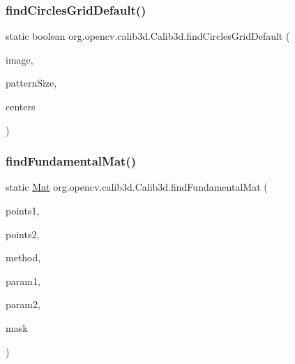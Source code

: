 \subsubsection{\texorpdfstring{find\+Circles\+Grid\+Default()}{findCirclesGridDefault()}\hspace{0.1cm}{\footnotesize\ttfamily [2/2]}}
{\footnotesize\ttfamily static boolean org.\+opencv.\+calib3d.\+Calib3d.\+find\+Circles\+Grid\+Default (\begin{DoxyParamCaption}\item[{\mbox{\hyperlink{classorg_1_1opencv_1_1core_1_1_mat}{Mat}}}]{image,  }\item[{\mbox{\hyperlink{classorg_1_1opencv_1_1core_1_1_size}{Size}}}]{pattern\+Size,  }\item[{\mbox{\hyperlink{classorg_1_1opencv_1_1core_1_1_mat}{Mat}}}]{centers }\end{DoxyParamCaption})\hspace{0.3cm}{\ttfamily [static]}}

\mbox{\label{classorg_1_1opencv_1_1calib3d_1_1_calib3d_a3dedba28209d17c56b4470b9cce95596}} 
\subsubsection{\texorpdfstring{find\+Fundamental\+Mat()}{findFundamentalMat()}\hspace{0.1cm}{\footnotesize\ttfamily [1/3]}}
{\footnotesize\ttfamily static \mbox{\hyperlink{classorg_1_1opencv_1_1core_1_1_mat}{Mat}} org.\+opencv.\+calib3d.\+Calib3d.\+find\+Fundamental\+Mat (\begin{DoxyParamCaption}\item[{\mbox{\hyperlink{classorg_1_1opencv_1_1core_1_1_mat_of_point2f}{Mat\+Of\+Point2f}}}]{points1,  }\item[{\mbox{\hyperlink{classorg_1_1opencv_1_1core_1_1_mat_of_point2f}{Mat\+Of\+Point2f}}}]{points2,  }\item[{int}]{method,  }\item[{double}]{param1,  }\item[{double}]{param2,  }\item[{\mbox{\hyperlink{classorg_1_1opencv_1_1core_1_1_mat}{Mat}}}]{mask }\end{DoxyParamCaption})\hspace{0.3cm}{\ttfamily [static]}}

